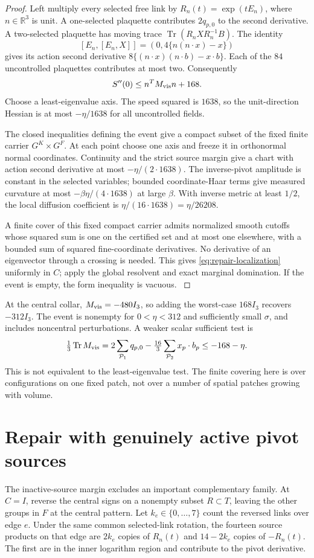 \documentclass[11pt,oneside,openany]{book}
\theoremstyle{definition}
\theoremstyle{remark}
\newcommand{\R}{\mathbb R}
\newcommand{\Tr}{\operatorname{Tr}}
\newcommand{\src}[2]{\cite[#2]{#1}}
\begin{document}
\begin{proof}
Left multiply every selected free link by
$R_n(t)=\exp(tE_n)$, where $n\in\R^3$ is unit. A one-selected
plaquette contributes $2q_{p,0}$ to the second derivative. A
two-selected plaquette has moving trace $\Tr(R_nXR_n^{-1}B)$.
The identity
\[
 [E_n,[E_n,X]]=(0,4\{n(n\cdot x)-x\})
\]
gives its action second derivative
$8\{(n\cdot x)(n\cdot b)-x\cdot b\}$. Each of the $84$
uncontrolled plaquettes contributes at most two. Consequently
\[
 S''(0)\le n^TM_{\rm vis}n+168.
\]
Choose a least-eigenvalue axis. The speed squared is $1638$, so the
unit-direction Hessian is at most $-\eta/1638$ for all uncontrolled
fields.

The closed inequalities defining the event give a compact subset of
the fixed finite carrier $G^K\times G^F$. At each point choose one
axis and freeze it in orthonormal normal coordinates. Continuity and
the strict source margin give a chart with action second derivative
at most $-\eta/(2\cdot1638)$. The inverse-pivot amplitude is constant
in the selected variables; bounded coordinate-Haar terms give measured
curvature at most $-\beta\eta/(4\cdot1638)$ at large $\beta$.
With inverse metric at least $1/2$, the local diffusion coefficient
is $\eta/(16\cdot1638)=\eta/26208$.

A finite cover of this fixed compact carrier admits normalized smooth
cutoffs whose squared sum is one on the certified set and at most one
elsewhere, with a bounded sum of squared fine-coordinate derivatives.
No derivative of an eigenvector through a crossing is needed. This
gives \cref{eq:repair-localization} uniformly in $C$; apply the global
resolvent and exact marginal domination. If the event is empty, the
form inequality is vacuous. \src{F13}{V16}
\end{proof}
At the central collar, $M_{\rm vis}=-480I_3$, so adding the worst-case
$168I_3$ recovers $-312I_3$. The event is nonempty for $0<\eta<312$
and sufficiently small $\sigma$, and includes noncentral perturbations.
A weaker scalar sufficient test is
\[
 \tfrac13\Tr M_{\rm vis}
 =2\sum_{\mathcal P_1}q_{p,0}
       -\tfrac{16}{3}\sum_{\mathcal P_2}x_p\cdot b_p
                         \le-168-\eta.
\]
This is not equivalent to the least-eigenvalue test. The finite
covering here is over configurations on one fixed patch, not over a
number of spatial patches growing with volume.

\section{Repair with genuinely active pivot sources}
\label{sec:active-repair}
The inactive-source margin excludes an important complementary family.
At $C=I$, reverse the central signs on a nonempty subset $R\subset T$,
leaving the other groups in $F$ at the central pattern. Let
$k_e\in\{0,\ldots,7\}$ count the reversed links over edge $e$.
Under the same common selected-link rotation, the fourteen source
products on that edge are $2k_e$ copies of $R_n(t)$ and
$14-2k_e$ copies of $-R_n(t)$. The first are in the inner logarithm
region and contribute to the pivot derivative.
\end{document}
